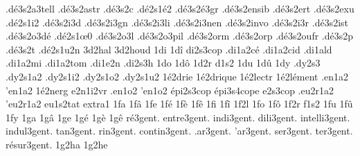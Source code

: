 {                    .d\'e3s2a3tell
                    .d\'e3s2astr
                    .d\'e3s2c %
                    .d\'e2s1\'e2
                    .d\'e3s2\'e3gr
                    .d\'e3s2ensib
                    .d\'e3s2ert
                    .d\'e3s2exu
                    .d\'e2s1i2
                    .d\'e3s2i3d
                    .d\'e3s2i3gn
                    .d\'e3s2i3li
                    .d\'e3s2i3nen
                    .d\'e3s2invo
                    .d\'e3s2i3r
                    .d\'e3s2ist
                    .d\'e3s2o3d\'e
                    .d\'e2s1\oe0 %
                    .d\'e3s2o3l
                    .d\'e3s2o3pil
                    .d\'e3s2orm
                    .d\'e3s2orp
                    .d\'e3s2oufr
                    .d\'e3s2p %
                    .d\'e3s2t %
                    .d\'e2s1u2n
                    3d2hal
                    3d2houd
1di
1d\^i
                    di2s3cop
                    .di1a2c\'e
                    .di1a2cid
                    .di1ald
                    .di1a2mi
                    .di1a2tom
                    .di1e2n
                    .di2s3h
1do
1d\^o
1d2r
d1s2
1du
1d\^u
1dy
                    .dy2s3
                    .dy2s1a2
                    .dy2s1i2
                    .dy2s1o2 %
                    .dy2s1u2
                    1\'e2drie
                    1\'e2drique
                    1\'e2lectr
                    1\'e2l\'ement
                    .en1a2
                    'en1a2
                    1\'e2nerg
                    e2n1i2vr
                    .en1o2
                    'en1o2
                    \'epi2s3cop
                    \'epi3s4cope
                    e2s3cop
                    .eu2r1a2
                    'eu2r1a2
                    eu1s2tat
                    extra1
1fa
1f\^a
1fe
1f\'e
1f\`e
1f\^e
1fi
1f\^i
1f2l
1fo
1f\^o
1f2r
f1s2
1fu
1f\^u
1fy
1ga
1g\^a
1ge
1g\'e
1g\`e
1g\^e
   r\'e3gent.
  entre3gent.
   indi3gent.
   dili3gent.
intelli3gent.
  indul3gent.
    tan3gent.
    rin3gent.
 contin3gent.
    .ar3gent.
    'ar3gent.
    ser3gent.
    ter3gent.
r\'esur3gent.
1g2ha
1g2he
}
